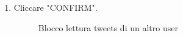 \begin{enumerate}
	\item Cliccare "CONFIRM".
	\begin{figure}[!ht]
		\centering
		\caption{Blocco lettura tweets di un altro user}
	\end{figure}
\end{enumerate}
